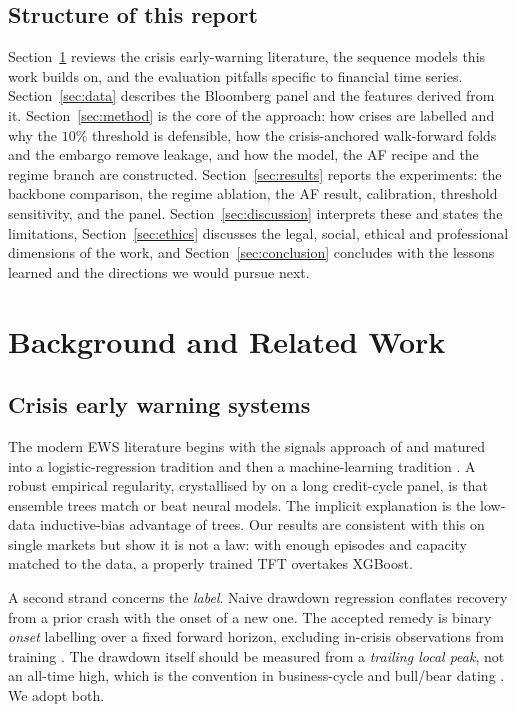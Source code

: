 \documentclass[11pt,a4paper]{article}
\begin{document}
\subsection{Structure of this report}
Section~\ref{sec:background} reviews the crisis early-warning literature, the
sequence models this work builds on, and the evaluation pitfalls specific to
financial time series. Section~\ref{sec:data} describes the Bloomberg panel and
the features derived from it. Section~\ref{sec:method} is the core of the
approach: how crises are labelled and why the $10\%$ threshold is defensible,
how the crisis-anchored walk-forward folds and the embargo remove leakage, and
how the model, the AF recipe and the regime branch are constructed.
Section~\ref{sec:results} reports the experiments: the backbone comparison, the
regime ablation, the AF result, calibration, threshold sensitivity, and the
panel. Section~\ref{sec:discussion} interprets these and states the
limitations, Section~\ref{sec:ethics} discusses the legal, social, ethical and
professional dimensions of the work, and Section~\ref{sec:conclusion} concludes
with the lessons learned and the directions we would pursue next.

\section{Background and Related Work}
\label{sec:background}

\subsection{Crisis early warning systems}
The modern EWS literature begins with the signals approach of
\citet{kaminsky1999leading} and matured into a logistic-regression tradition
\citep{frankelsaravelos2012} and then a machine-learning tradition
\citep{beutel2019does,holopainen2017toward,chatzis2018forecasting}. A robust
empirical regularity, crystallised by \citet{bluwstein2023credit} on a long
credit-cycle panel, is that ensemble trees match or beat neural models. The
implicit explanation is the low-data inductive-bias advantage of trees. Our
results are consistent with this on single markets but show it is not a law:
with enough episodes and capacity matched to the data, a properly trained TFT
overtakes XGBoost.

A second strand concerns the \emph{label}. Naive drawdown regression conflates
recovery from a prior crash with the onset of a new one. The accepted remedy
is binary \emph{onset} labelling over a fixed forward horizon, excluding
in-crisis observations from training
\citep{dichtl2023ews,holopainen2017toward,bluwstein2023credit}. The drawdown
itself should be measured from a \emph{trailing local peak}, not an all-time
high, which is the convention in business-cycle and bull/bear dating
\citep{pagansossounov2003,lundetimmermann2004}. We adopt both.
\end{document}
